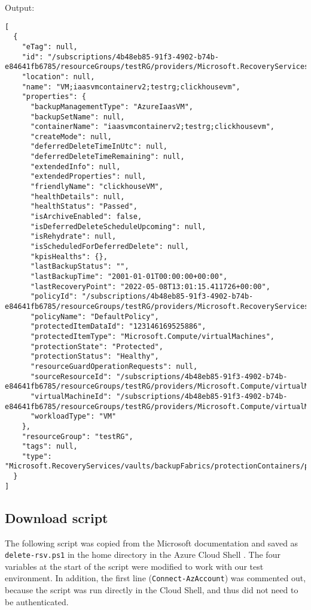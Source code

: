 Output:
\begin{verbatim}
[
  {
    "eTag": null,
    "id": "/subscriptions/4b48eb85-91f3-4902-b74b-e84641fb6785/resourceGroups/testRG/providers/Microsoft.RecoveryServices/vaults/myRSV/backupFabrics/Azure/protectionContainers/IaasVMContainer;iaasvmcontainerv2;testrg;clickhousevm/protectedItems/VM;iaasvmcontainerv2;testrg;clickhousevm",
    "location": null,
    "name": "VM;iaasvmcontainerv2;testrg;clickhousevm",
    "properties": {
      "backupManagementType": "AzureIaasVM",
      "backupSetName": null,
      "containerName": "iaasvmcontainerv2;testrg;clickhousevm",
      "createMode": null,
      "deferredDeleteTimeInUtc": null,
      "deferredDeleteTimeRemaining": null,
      "extendedInfo": null,
      "extendedProperties": null,
      "friendlyName": "clickhouseVM",
      "healthDetails": null,
      "healthStatus": "Passed",
      "isArchiveEnabled": false,
      "isDeferredDeleteScheduleUpcoming": null,
      "isRehydrate": null,
      "isScheduledForDeferredDelete": null,
      "kpisHealths": {},
      "lastBackupStatus": "",
      "lastBackupTime": "2001-01-01T00:00:00+00:00",
      "lastRecoveryPoint": "2022-05-08T13:01:15.411726+00:00",
      "policyId": "/subscriptions/4b48eb85-91f3-4902-b74b-e84641fb6785/resourceGroups/testRG/providers/Microsoft.RecoveryServices/vaults/myRSV/backupPolicies/DefaultPolicy",
      "policyName": "DefaultPolicy",
      "protectedItemDataId": "123146169525886",
      "protectedItemType": "Microsoft.Compute/virtualMachines",
      "protectionState": "Protected",
      "protectionStatus": "Healthy",
      "resourceGuardOperationRequests": null,
      "sourceResourceId": "/subscriptions/4b48eb85-91f3-4902-b74b-e84641fb6785/resourceGroups/testRG/providers/Microsoft.Compute/virtualMachines/clickhouseVM",
      "virtualMachineId": "/subscriptions/4b48eb85-91f3-4902-b74b-e84641fb6785/resourceGroups/testRG/providers/Microsoft.Compute/virtualMachines/clickhouseVM",
      "workloadType": "VM"
    },
    "resourceGroup": "testRG",
    "tags": null,
    "type": "Microsoft.RecoveryServices/vaults/backupFabrics/protectionContainers/protectedItems"
  }
]
\end{verbatim}

\subsection{Download script}
\label{sec:org3312e3f}
The following script was copied from the Microsoft documentation and
saved as \texttt{delete-rsv.ps1} in the home directory in the Azure Cloud Shell \cite{v-amallick_script_nodate}.
The four variables at the start of the script were modified to work with our test environment.
In addition, the first line (\texttt{Connect-AzAccount}) was commented out,
because the script was run directly in the Cloud Shell,
and thus did not need to be authenticated.

